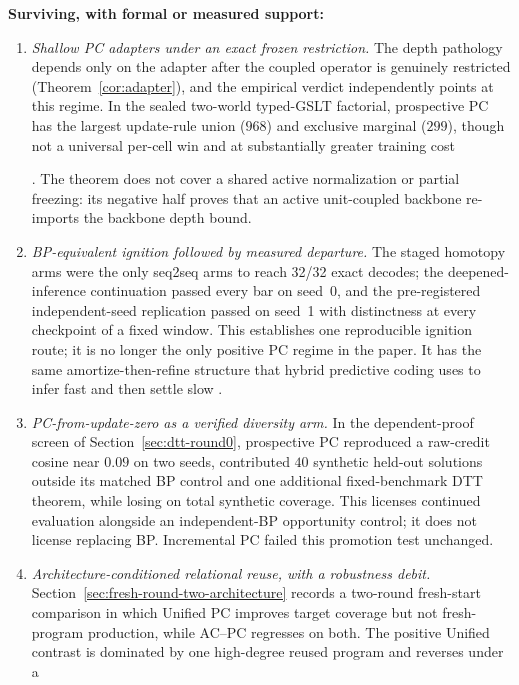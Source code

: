 \documentclass[11pt]{article}
\newif\ifoeisterminalfacts
\begin{document}
\textbf{Surviving, with formal or measured support:}
\begin{enumerate}
\item \emph{Shallow PC adapters under an exact frozen restriction.} The depth pathology
  depends only on the adapter after the coupled operator is genuinely restricted
  (Theorem~\ref{cor:adapter}), and the empirical verdict independently points at this
  regime. In the sealed two-world typed-GSLT factorial, prospective PC has the largest
  update-rule union ($968$) and exclusive marginal ($299$), though not a universal
  per-cell win and at substantially greater training cost%
\ifoeisterminalfacts
; the subsequent mis-specified single-world branch (recorded, not evidential:
  Section~\ref{sec:pc-terminal}) logged the reverse ordering%
\fi
. The theorem does not cover a shared active
  normalization or partial freezing:
  its negative half proves that an active unit-coupled backbone re-imports the backbone
  depth bound.
\item \emph{BP-equivalent ignition followed by measured departure.} The staged homotopy
  arms were the only seq2seq arms to reach
  32/32 exact decodes; the deepened-inference continuation passed every bar on seed~0, and
  the pre-registered independent-seed replication passed on seed~1 with distinctness at
  every checkpoint of a fixed window. This establishes one reproducible ignition route;
  it is no longer the only positive PC regime in the paper. It has the same
  amortize-then-refine structure that
  hybrid predictive coding uses to infer fast and then settle slow \cite{tschantz2023}.
\item \emph{PC-from-update-zero as a verified diversity arm.} In the dependent-proof
  screen of Section~\ref{sec:dtt-round0}, prospective PC reproduced a raw-credit cosine
  near $0.09$ on two seeds, contributed $40$ synthetic held-out solutions outside its
  matched BP control and one additional fixed-benchmark DTT theorem, while losing on
  total synthetic coverage. This licenses continued evaluation alongside an
  independent-BP opportunity control; it does not license replacing BP. Incremental PC
  failed this promotion test unchanged.
\item \emph{Architecture-conditioned relational reuse, with a robustness debit.}
  Section~\ref{sec:fresh-round-two-architecture} records a two-round fresh-start
  comparison in which Unified PC improves target coverage but not fresh-program
  production, while AC--PC regresses on both. The positive Unified contrast is
  dominated by one high-degree reused program and reverses under a

\end{enumerate}
\end{document}
